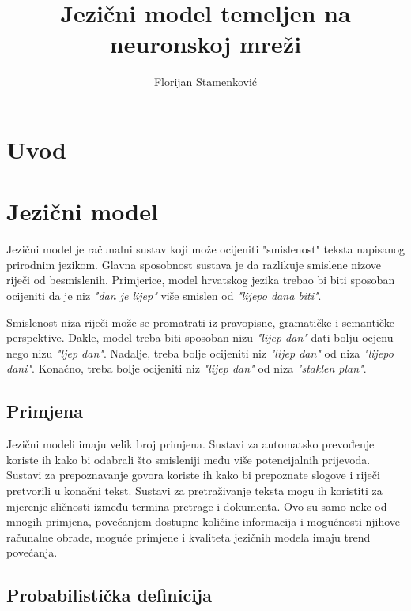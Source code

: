 \documentclass[times, utf8, diplomski, numeric]{fer}
\begin{document}
\title{Jezični model temeljen na neuronskoj mreži}

\author{Florijan Stamenković}

\maketitle

\tableofcontents

\chapter{Uvod}


\chapter{Jezični model}

Jezični model je računalni sustav koji može ocijeniti "smislenost" teksta napisanog prirodnim jezikom. Glavna sposobnost sustava je da razlikuje smislene nizove riječi od besmislenih. Primjerice, model hrvatskog jezika trebao bi biti sposoban ocijeniti da je niz \textit{"dan je lijep"} više smislen od \textit{"lijepo dana biti"}.

Smislenost niza riječi može se promatrati iz pravopisne, gramatičke i semantičke perspektive. Dakle, model treba biti sposoban nizu \textit{"lijep dan"} dati bolju ocjenu nego nizu \textit{"ljep dan"}. Nadalje, treba bolje ocijeniti niz \textit{"lijep dan"} od niza \textit{"lijepo dani"}. Konačno, treba bolje ocijeniti niz \textit{"lijep dan"} od niza \textit{"staklen plan"}.

\section{Primjena}

Jezični modeli imaju velik broj primjena. Sustavi za automatsko prevođenje koriste ih kako bi odabrali što smisleniji među više potencijalnih prijevoda. Sustavi za prepoznavanje govora koriste ih kako bi prepoznate slogove i riječi pretvorili u konačni tekst. Sustavi za pretraživanje teksta mogu ih koristiti za mjerenje sličnosti između termina pretrage i dokumenta. Ovo su samo neke od mnogih primjena, povećanjem dostupne količine informacija i mogućnosti njihove računalne obrade, moguće primjene i kvaliteta jezičnih modela imaju trend povećanja.

\section{Probabilistička definicija}
\end{document}
